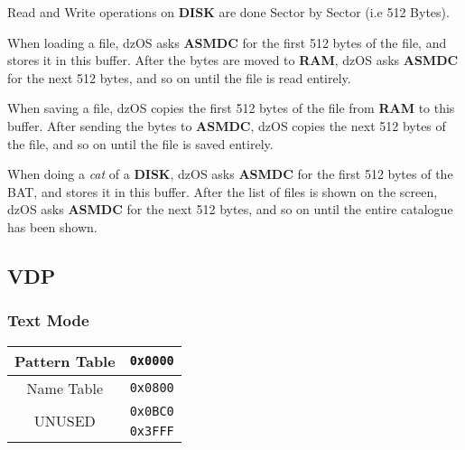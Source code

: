         Read and Write operations on \textbf{DISK} are done Sector by Sector (i.e 
        512 Bytes).

        When loading a file, dzOS asks \textbf{ASMDC} for the first 512 bytes of the
        file, and stores it in this buffer. After the bytes are moved to
        \textbf{RAM}, dzOS asks \textbf{ASMDC} for the next 512 bytes, and so on
        until the file is read entirely.

        When saving a file, dzOS copies the first 512 bytes of the file from
        \textbf{RAM} to this buffer. After sending the bytes to \textbf{ASMDC}, dzOS
        copies the next 512 bytes of the file, and so on until the file is saved
        entirely.

        When doing a \textit{cat} of a \textbf{DISK}, dzOS asks \textbf{ASMDC} for
        the first 512 bytes of the BAT, and stores it in this buffer. After the list
        of files is shown on the screen, dzOS asks \textbf{ASMDC} for the next 512
        bytes, and so on until the entire catalogue has been shown.

    \subsection{VDP}
    \label{subsec:vdp_memmap}

        \subsubsection{Text Mode}
        \begin{center}
            \begin{tabular}{c r}
                \hline
                Pattern Table           & \texttt{0x0000}\\
                \hline
                Name Table              & \texttt{0x0800}\\
                \hline
                \multirow{2}{*}{UNUSED} & \texttt{0x0BC0}\\
                                        & \texttt{0x3FFF}\\
                \hline
            \end{tabular}
        \end{center}


